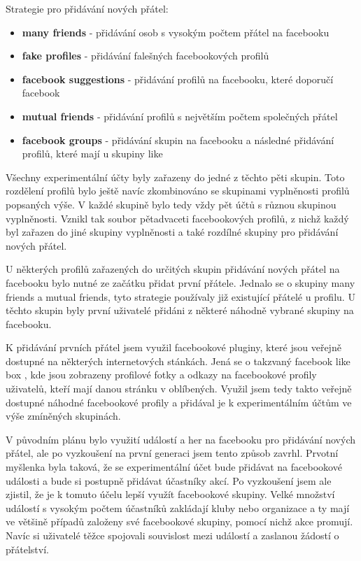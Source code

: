 \documentclass[thesis=M,czech]{FITthesis}[2013/05/10]
\begin{document}
Strategie pro přidávání nových přátel:

\begin{itemize}
  \item \textbf{many friends} - přidávání osob s vysokým počtem přátel na facebooku
  \item \textbf{fake profiles} - přidávání falešných facebookových profilů
  \item \textbf{facebook suggestions} - přidávání profilů na facebooku, které doporučí facebook 
  \item \textbf{mutual friends} - přidávání profilů s největším počtem společných přátel
  \item \textbf{facebook groups} - přidávání skupin na facebooku a následné přidávání profilů, které mají u skupiny like
\end{itemize}

Všechny experimentální účty byly zařazeny do jedné z těchto pěti skupin. Toto rozdělení profilů bylo ještě navíc zkombinováno se skupinami vyplněnosti profilů popsaných výše. V každé skupině bylo tedy vždy pět účtů s různou skupinou vyplněnosti. Vznikl tak soubor pětadvaceti facebookových profilů, z nichž každý byl zařazen do jiné skupiny vyplněnosti a také rozdílné skupiny pro přidávání nových přátel.

U některých profilů zařazených do určitých skupin přidávání nových přátel na facebooku bylo nutné ze začátku přidat první přátele. Jednalo se o skupiny many friends a mutual friends, tyto strategie používaly již existující přátelé u profilu. U těchto skupin byly první uživatelé přidáni z některé náhodně vybrané skupiny na facebooku. 

K přidávání prvních přátel jsem využil facebookové pluginy, které jsou veřejně dostupné na některých internetových stánkách. Jená se o takzvaný facebook like box \cite{fbLikeBox}, kde jsou zobrazeny profilové fotky a odkazy na facebookové profily uživatelů, kteří mají danou stránku v oblíbených. Využil jsem tedy takto veřejně dostupné náhodné facebookové profily a přidával je k experimentálním účtům ve výše zmíněných skupinách.

V původním plánu bylo využití událostí a her na facebooku pro přidávání nových přátel, ale po vyzkoušení na první generaci jsem tento způsob zavrhl. Prvotní myšlenka byla taková, že se experimentální účet bude přidávat na facebookové události a bude si postupně přidávat účastníky akcí. Po vyzkoušení jsem ale zjistil, že je k tomuto účelu lepší využít facebookové skupiny. Velké množství událostí s vysokým počtem účastníků zakládají kluby nebo organizace a ty mají ve většině případů založeny své facebookové skupiny, pomocí nichž akce promují. Navíc si uživatelé těžce spojovali souvislost mezi událostí a zaslanou žádostí o přátelství.
\end{document}
